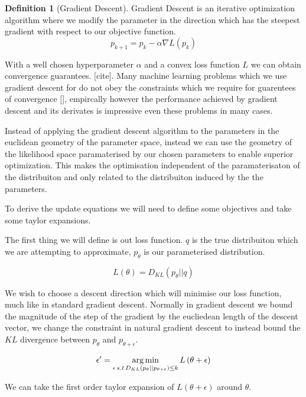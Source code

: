 \documentclass[12pt, a4paper]{report}
\theoremstyle{definition}
\newtheorem{definition}{Definition}[section]
\begin{document}
\begin{definition}[Gradient Descent]
    Gradient Descent is an iterative optimization algorithm where we modify the parameter in the direction which has the steepest gradient with respect to our objective function.
    $$p_{k+1} = p_{k} -  \alpha \nabla L(p_k)$$
\end{definition}

With a well chosen hyperparameter $\alpha$ and a convex loss function $L$ we can obtain convergence guarantees. [cite]. Many machine learning problems which we use gradient descent for do not obey the constraints which we require for guarentees of convergence [], empircally however the performance achieved by gradient descent and its derivates is impressive even these problems in many cases.

Instead of applying the gradient descent algorithm to the parameters in the euclidean geometry of the parameter space, instead we can use the geometry of the likelihood space paramaterised by our chosen parameters to enable superior optimization. This makes the optimisation independent of the paramaterisaton of the distribuiton and only related to the distribuiton induced by the the parameters.
 
To derive the update equations we will need to define some objectives and take some taylor expansions.

The first thing we will define is out loss function. $q$ is the true distribuiton which we are attempting to approximate, $p_\theta$ is our parameterised distribution.

$$L \left(\theta \right) = D_{KL} \left(p_\theta || q \right) $$

We wish to choose a descent direction which will minimise our loss function, much like in standard gradient descent. Normally in gradient descent we bound the magnitude of the step of the gradient by the eucliedean length of the descent vector, we change the constraint in natural gradient descent to instead bound the $KL$ divergence between $p_\theta$ and $p_{\theta + \epsilon}$.

\begin{align}
    \epsilon^\prime &= \operatorname*{arg\,min}_{\epsilon \, s.t \, D_{KL} \left(p_\theta || p_{\theta + \epsilon} \right) \leq k} L \left( \theta + \epsilon \right) \\
\end{align}

We can take the first order taylor expansion of $L\left(\theta + \epsilon\right)$ around $\theta$.
\end{document}
